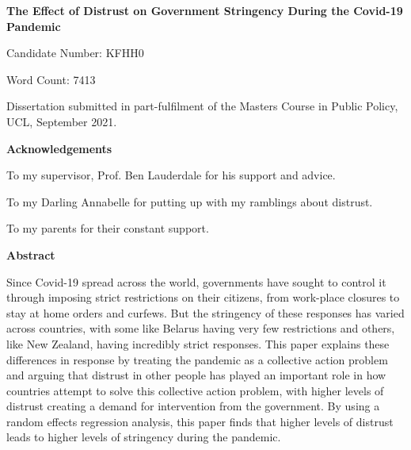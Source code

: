 \documentclass[
  11pt,
]{article}
\author{}
\date{\vspace{-2.5em}}
\begin{document}
\begin{titlepage}
\begin{center}
\vspace*{5cm}
\LARGE
\textbf{The Effect of Distrust on Government Stringency During the Covid-19 Pandemic}


\vspace{1.5cm}
\large
Candidate Number: KFHH0

\vspace{0.5cm}
Word Count: 7413

\vfill

Dissertation submitted in part-fulfilment of the Masters Course in Public Policy, UCL,  September 2021.

\end{center}
\end{titlepage}

\begin{center}
\textbf{Acknowledgements}

To my supervisor, Prof. Ben Lauderdale for his support and advice.

To my Darling Annabelle for putting up with my ramblings about distrust.

To my parents for their constant support.
\end{center}

\pagebreak

\begin{center}
\vspace*{5cm}
\textbf{Abstract}
\end{center}
Since Covid-19 spread across the world, governments have sought to control it through imposing strict restrictions on their citizens, from work-place closures to stay at home orders and curfews. But the stringency of these responses has varied across countries, with some like Belarus having very few restrictions and others, like New Zealand, having incredibly strict responses. This paper explains these differences in response by treating the pandemic as a collective action problem and arguing that distrust in other people has played an important role in how countries attempt to solve this collective action problem, with higher levels of distrust creating a demand for intervention from the government. By using a random effects regression analysis, this paper finds that higher levels of distrust leads to higher levels of stringency during the pandemic.
\pagebreak

\clearpage
\tableofcontents
{} 
\newpage
{}
\end{document}
